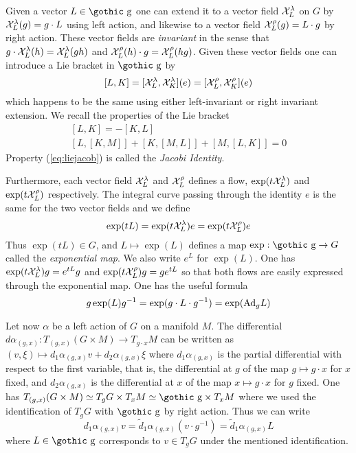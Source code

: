\documentclass[12pt,titlepage]{article}
\def\goth#1{\hbox{\gothic #1}}
\def\cX{{\cal X}}
\def\gg{{\goth g}}
\def\Ad{\hbox{Ad}}
\begin{document}
Given a vector \(L\in \gg\) one can extend it to a vector field
\(\cX^\lambda_L\)
on \(G\) by  \(\cX^\lambda_L(g) = g\cdot L\) using left action, and
likewise to a
vector field \(\cX^\rho_L(g) = L\cdot g\) by right action. These vector
fields are {\em invariant\/} in the sense that
\(g\cdot\cX^\lambda_L(h) =
\cX^\lambda_L(gh)\) and \(\cX^\rho_L(h)\cdot g = \cX^\rho_L(hg)\).  Given
these vector fields
one can introduce a Lie bracket in \(\gg\) by
\[
[L,K] = [\cX^\lambda_L,\cX^\lambda_K](e) = [\cX^\rho_L,\cX^\rho_K](e)
\]%
which happens to be the same using either
left-invariant or right invariant extension.
We recall the properties of the Lie bracket
\begin{eqnarray}\label{eq:lieassym}
& [L,K] = -[K,L] & \\ \label{eq:liejacob}
&[L,[K,M]] +[K,[M,L]]+[M,[L,K]] = 0 &
\end{eqnarray}%
Property (\ref{eq:liejacob}) is called the {\em Jacobi Identity\/}.

Furthermore, each vector field \(\cX^\lambda_L\) and \(\cX^\rho_L\) 
defines a flow,
\(\exp({t\cX^\lambda_L})\) and \(\exp({t\cX^\rho_L})\) respectively.
The integral curve passing through the identity \(e\) is the same for
the two vector fields and we define
\[
\exp(tL)  = \exp({t\cX^\lambda_L})e =\exp({t\cX^\rho_L})e
\]
Thus \(\exp(tL) \in G\), and \(L \mapsto \exp(L)\) defines a map
\(\exp:\gg \to G\) called the {\em exponential map\/}.
%
 We also write
\(e^{L}\)
%
 for \(\exp(L)\). One has
\(\exp({t\cX^\lambda_L})g = e^{tL}g\) and \(\exp({t\cX^\rho_L})g=ge^{tL}\)
so that both
flows are easily expressed through the exponential map. One has the
useful formula
\[
g \exp(L) g^{-1} = \exp(g\cdot L\cdot g^{-1})=\exp(\Ad_g L)
\]







Let now \(\alpha\) be a  left action  of \(G\) on a
manifold \(M\). The differential
\(d\alpha_{(g,x)}:T_{(g,x)}(G\times M)\to T_{g\cdot x}M\) 
can be written as
\((v,\xi) \mapsto d_1\alpha_{(g,x)}v + d_2\alpha_{(g,x)}\xi\)
%
%
where
\(d_1\alpha_{(g,x)}\) is the partial differential with respect to the
first variable, that is, the differential at \(g\) of the map \(g\mapsto
g\cdot
x\) for \(x\) fixed, and \(d_2\alpha_{(g,x)}\) is the differential at
\(x\) of the map \(x\mapsto g\cdot x\) for \(g\) fixed.  One has
\(T_{(g,x)}(G\times M) \simeq T_gG\times T_xM \simeq \gg \times T_xM\)
where we used the identification of \(T_gG\) with \(\gg\) by right
action. Thus we can write 
\begin{equation}\label{eq:dtilde}
d_1\alpha_{(g,x)}v = \tilde
d_1\alpha_{(g,x)}(v\cdot
g^{-1})=  \tilde d_1\alpha_{(g,x)}L
\end{equation}%
%
 where \(L\in\gg\) corresponds to
\(v\in T_gG\) under the mentioned identification.
\end{document}
